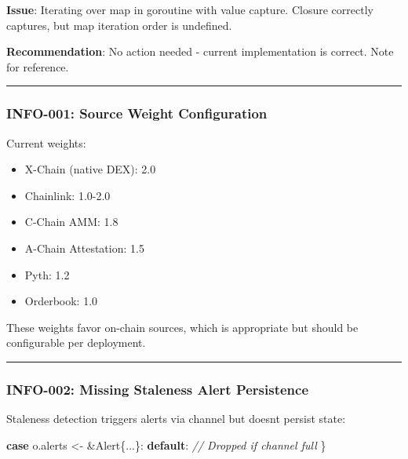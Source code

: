 \documentclass[
]{article}
\newenvironment{Shaded}{}{}
\newcommand{\CommentTok}[1]{\textcolor[rgb]{0.38,0.63,0.69}{\textit{#1}}}
\newcommand{\ControlFlowTok}[1]{\textcolor[rgb]{0.00,0.44,0.13}{\textbf{#1}}}
\newcommand{\NormalTok}[1]{#1}
\newcommand{\OperatorTok}[1]{\textcolor[rgb]{0.40,0.40,0.40}{#1}}
\providecommand{\tightlist}{%
  \setlength{\itemsep}{0pt}\setlength{\parskip}{0pt}}
\begin{document}
\textbf{Issue}: Iterating over map in goroutine with value capture.
Closure correctly captures, but map iteration order is undefined.

\textbf{Recommendation}: No action needed - current implementation is
correct. Note for reference.

\begin{center}\rule{0.5\linewidth}{0.5pt}\end{center}

\subsubsection{INFO-001: Source Weight
Configuration}\label{info-001-source-weight-configuration}

Current weights:

\begin{itemize}
\tightlist
\item
  X-Chain (native DEX): 2.0
\item
  Chainlink: 1.0-2.0
\item
  C-Chain AMM: 1.8
\item
  A-Chain Attestation: 1.5
\item
  Pyth: 1.2
\item
  Orderbook: 1.0
\end{itemize}

These weights favor on-chain sources, which is appropriate but should be
configurable per deployment.

\begin{center}\rule{0.5\linewidth}{0.5pt}\end{center}

\subsubsection{INFO-002: Missing Staleness Alert
Persistence}\label{info-002-missing-staleness-alert-persistence}

Staleness detection triggers alerts via channel but
doesn\textquotesingle t persist state:

\begin{Shaded}
\begin{Highlighting}[]
\ControlFlowTok{case}\NormalTok{ o}\OperatorTok{.}\NormalTok{alerts }\OperatorTok{\textless{}{-}} \OperatorTok{\&}\NormalTok{Alert}\OperatorTok{\{...\}:}
\ControlFlowTok{default}\OperatorTok{:}
    \CommentTok{// Dropped if channel full}
\OperatorTok{\}}
\end{Highlighting}
\end{Shaded}
\end{document}
